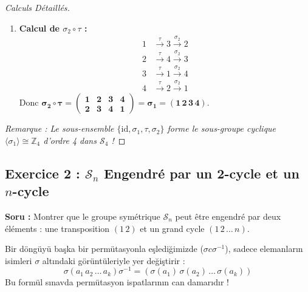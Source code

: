 \documentclass[12pt,a4paper]{report}
\begin{document}
\begin{proof}[Calculs Détaillés]
\begin{enumerate}
    \item \textbf{Calcul de $\sigma_2 \circ \tau$ :}
    \begin{align*}
    1 &\xrightarrow{\tau} 3 \xrightarrow{\sigma_2} 2 \\
    2 &\xrightarrow{\tau} 4 \xrightarrow{\sigma_2} 3 \\
    3 &\xrightarrow{\tau} 1 \xrightarrow{\sigma_2} 4 \\
    4 &\xrightarrow{\tau} 2 \xrightarrow{\sigma_2} 1
    \end{align*}
    Donc $\mathbf{\sigma_2 \circ \tau = \begin{pmatrix} 1 & 2 & 3 & 4 \\ 2 & 3 & 4 & 1 \end{pmatrix} = \sigma_1 = (1\,2\,3\,4)}$.
\end{enumerate}
\textit{Remarque : Le sous-ensemble $\{\mathrm{id}, \sigma_1, \tau, \sigma_2\}$ forme le sous-groupe cyclique $\langle \sigma_1 \rangle \cong \mathbb{Z}_4$ d'ordre 4 dans $\mathcal{S}_4$ !}
\end{proof}

\vspace{0.5cm}

\subsection*{Exercice 2 : $\mathcal{S}_n$ Engendré par un 2-cycle et un $n$-cycle}
\textbf{Soru :} Montrer que le groupe symétrique $\mathcal{S}_n$ peut être engendré par deux éléments : une transposition $(1\,2)$ et un grand cycle $(1\,2\,\dots\,n)$.

\begin{tcolorbox}[colback=purple!5!white,colframe=purple!75!black,title=Önemli Bağıntı : Döngülerin Eşlenikliği (Conjugaison de Cycles)]
Bir döngüyü başka bir permütasyonla eşlediğimizde ($\sigma c \sigma^{-1}$), sadece elemanların isimleri $\sigma$ altındaki görüntüleriyle yer değiştirir :
\[ \sigma (a_1 \, a_2 \, \dots \, a_k) \sigma^{-1} = (\sigma(a_1) \, \sigma(a_2) \, \dots \, \sigma(a_k)) \]
Bu formül sınavda permütasyon ispatlarının can damarıdır !
\end{tcolorbox}
\end{document}
